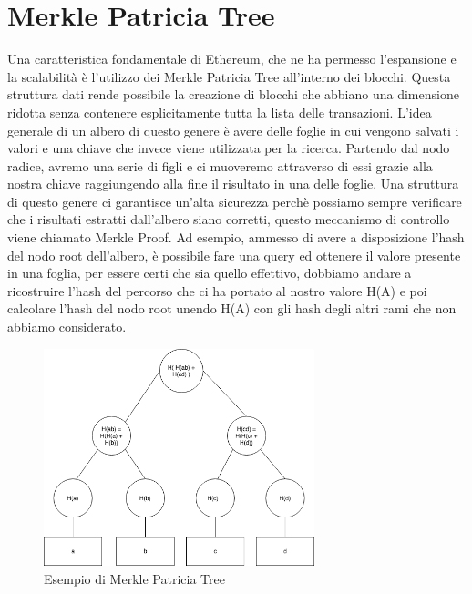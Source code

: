 \documentclass[12pt]{report}
\begin{document}
\newpage
\section{Merkle Patricia Tree}

Una caratteristica fondamentale di Ethereum, che ne ha permesso l'espansione e la scalabilità è l'utilizzo dei Merkle Patricia Tree all'interno dei blocchi. 
Questa struttura dati rende possibile la creazione di blocchi che abbiano una dimensione ridotta senza contenere esplicitamente tutta la lista delle transazioni.
L'idea generale di un albero di questo genere è avere delle foglie in cui vengono salvati i valori e una chiave che invece viene utilizzata per la ricerca. Partendo dal nodo radice, avremo una serie di figli e ci muoveremo attraverso di essi grazie alla nostra chiave raggiungendo alla fine il risultato in una delle foglie.
Una struttura di questo genere ci garantisce un'alta sicurezza perchè possiamo sempre verificare che i risultati estratti dall'albero siano corretti, questo meccanismo di controllo viene chiamato Merkle Proof.
Ad esempio, ammesso di avere a disposizione l'hash del nodo root dell'albero, è possibile fare una query ed ottenere il valore presente in una foglia, per essere certi che sia quello effettivo, dobbiamo andare a ricostruire l'hash del percorso che ci ha portato al nostro valore H(A) e poi calcolare l'hash del nodo root unendo H(A) con gli hash degli altri rami che non abbiamo considerato.

\begin{figure}[H]
    \centering\includegraphics[width=0.7\textwidth]{radixTree}
    \caption{Esempio di Merkle Patricia Tree}
\end{figure}
\end{document}
